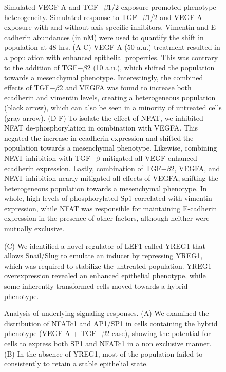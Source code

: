 \documentclass[11pt,letterpaper]{article}
\begin{document}
\clearpage

\begin{figure}
\caption{Simulated VEGF-A and TGF$-\beta$1/2 exposure promoted phenotype heterogeneity.
Simulated response to TGF$-\beta$1/2 and VEGF-A exposure with and without axis specific inhibitors.
Vimentin and E-cadherin abundances (in nM) were used to quantify the shift in population at 48 hrs.
(A-C) VEGF-A (50 a.u.) treatment resulted in a population with enhanced epithelial properties.
This was contrary to the addition of TGF$-\beta$2 (10 a.u.), which shifted the population towards a mesenchymal phenotype.
Interestingly, the combined effects of TGF$-\beta$2 and VEGFA was found to increase both ecadherin and vimentin levels, creating a heterogeneous population (black arrow), which can also be seen in a minority of untreated cells (gray arrow). (D-F) To isolate the effect of NFAT, we inhibited NFAT de-phosphorylation in combination with VEGFA. This negated the increase in ecadherin expression and shifted the population towards a mesenchymal phenotype.  Likewise, combining NFAT inhibition with TGF$-\beta$ mitigated all VEGF enhanced ecadherin expression.
Lastly, combination of TGF$-\beta$2, VEGFA, and NFAT inhibition nearly mitigated all effects of VEGFA, shifting the heterogeneous population towards a mesenchymal phenotype.
In whole, high levels of phosphorylated-Sp1 correlated with vimentin expression, while NFAT was responsible for maintaining E-cadherin expression in the presence of other factors, although neither were mutually exclusive.}
\label{fg:F3}
\end{figure}

\clearpage

\begin{figure}
\caption{Analysis of underlying signaling responses.
(A) We examined the distribution of NFATc1 and AP1/SP1 in cells containing the hybrid phenotype (VEGF-A + TGF$-\beta$2 case), showing the potential for cells to express both SP1 and NFATc1 in a non exclusive manner.
(B) In the absence of YREG1, most of the population failed to consistently to retain a stable epithelial state.}\label{fg:F4}
(C) We identified a novel regulator of LEF1 called YREG1 that allows Snail/Slug to emulate an inducer by repressing YREG1, which was required to stabilize the untreated population.
YREG1 overexpression revealed an enhanced epithelial phenotype, while some inherently transformed cells moved towards a hybrid phenotype.
\end{figure}
\end{document}
